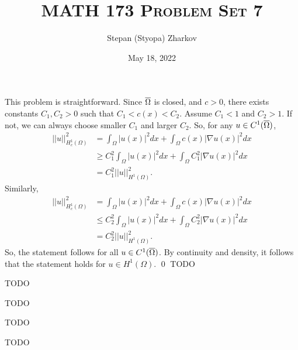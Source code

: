 \documentclass{article}
\title{\textsc{MATH 173 Problem Set 7}}
\author{Stepan (Styopa) Zharkov}
\date{May 18, 2022}
\newcommand{\D}{\nabla}
\begin{document}
\maketitle
{} 
 \tri
\hop 
\solution
This problem is straightforward. Since ${\overline{\Omega}}$ is closed, and $c > 0$, there exists constants $C_1, C_2 >0$ such that $C_1 < c(x) < C_2$. Assume $C_1 < 1$ and $C_2 > 1$. If not, we can always choose smaller $C_1$ and larger $C_2$. So, for any $u \in C^1({\overline{\Omega}})$, 
\begin{align*}
    ||u||^2_{H^1_c(\Omega)} &= \int_\Omega |u(x)|^2 dx + \int_\Omega c(x) |\D u (x)|^2 dx \\
    &\ge C_1^2\int_\Omega |u(x)|^2 dx + \int_\Omega C_1^2|\D u (x)|^2 dx\\
    &= C_1^2||u||^2_{H^1(\Omega)}.
\end{align*}
Similarly, 
\begin{align*}
    ||u||^2_{H^1_c(\Omega)} &= \int_\Omega |u(x)|^2 dx + \int_\Omega c(x) |\D u (x)|^2 dx \\
    &\le C_2^2\int_\Omega |u(x)|^2 dx + \int_\Omega C_2^2|\D u (x)|^2 dx\\
    &= C_2^2||u||^2_{H^1(\Omega)}.
\end{align*}
So, the statement follows for all  $u \in C^1({\overline{\Omega}})$. By continuity and density, it follows that the statement holds for $u \in H^1(\Omega)$. \qed
\newpage
{} 
 \tri
\hop 
\solution
TODO

\newpage
{} 
 \tri
\hop 
\solution
TODO

\newpage
{} 
 \tri
\hop 
\solution
TODO

\newpage
{} 
 \tri
\hop 
\solution
TODO

\newpage
{} 
 \tri
\hop 
\solution
TODO
\end{document}
